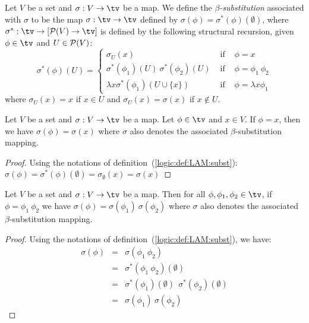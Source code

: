 \begin{defin}\label{logic:def:LAM:subst}
Let $V$ be  a set and $\sigma :V\to \tv$ be a map. We define the
{\em $\beta$-substitution} associated with
$\sigma$ to be the map $\sigma:\tv\to\tv$ defined by
$\sigma(\phi)=\sigma^{*}(\phi)(\emptyset)$, where
$\sigma^{*}:\tv\to[{\cal P}(V)\to\tv]$ is defined by the following structural
recursion, given $\phi\in\tv$ and $U\in{\cal P}(V)$:
    \begin{equation}\label{logic:eqn:LAM:subst:1}
                    \sigma^{*}(\phi)(U)=\left\{
                    \begin{array}{lcl}
                    \sigma_{U}(x)&\mbox{\ if\ }&\phi=x\\
                    \sigma^{*}(\phi_{1})(U)\ \sigma^{*}(\phi_{2})(U)
                    &\mbox{\ if\ }&\phi=\phi_{1}\ \phi_{2}\\
                    \lambda x\sigma^{*}(\phi_{1})(U\cup\{x\})&
                    \mbox{\ if\ }&\phi=\lambda x\phi_{1}
                    \end{array}\right.
    \end{equation}
where $\sigma_{U}(x)=x$ if $x\in U$ and
$\sigma_{U}(x)=\sigma(x)$ if $x\not\in U$.
\end{defin}

\begin{prop}\label{logic:prop:LAM:subst:x}
Let $V$ be a set and $\sigma:V\to\tv$ be a map. Let $\phi\in\tv$ and $x\in V$. 
If $\phi = x$, then  we have $\sigma(\phi) = \sigma(x)$ where $\sigma$ also 
denotes the associated $\beta$-substitution mapping.
\end{prop}
\begin{proof}
    Using the notations of definition~(\ref{logic:def:LAM:subst}):
    $\sigma(\phi) = \sigma^{*}(\phi)(\emptyset) = \sigma_{\emptyset}(x)
    =\sigma(x)$
\end{proof}
\begin{prop}\label{logic:prop:LAM:subst:app}
    Let $V$ be a set and $\sigma:V\to\tv$ be a map. 
    Then for all  $\phi,\phi_{1},\phi_{2}\in\tv$, if $\phi = \phi_{1}\ \phi_{2}$
    we have $\sigma(\phi) = \sigma(\phi_{1})\ \sigma(\phi_{2})$ 
    where $\sigma$ also denotes the associated $\beta$-substitution mapping.
\end{prop}
\begin{proof}
    Using the notations of definition~(\ref{logic:def:LAM:subst}), we have:
        \begin{eqnarray*}
            \sigma(\phi)&=&\sigma(\phi_{1}\ \phi_{2})\\
            &=&\sigma^{*}(\phi_{1}\ \phi_{2})(\emptyset)\\
            &=&\sigma^{*}(\phi_{1})(\emptyset)\ \ \sigma^{*}(\phi_{2})(\emptyset)\\
            &=&\sigma(\phi_{1})\ \sigma(\phi_{2})
        \end{eqnarray*}
\end{proof}

